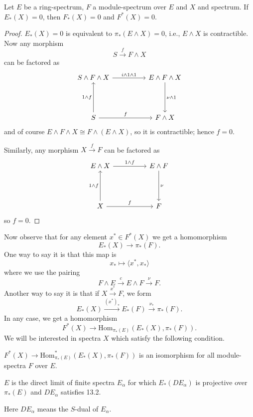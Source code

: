 \documentclass[../main]{subfiles}
\begin{document}
\begin{lemma}\label{lem:p3ch13.1}
Let $E$ be a ring-spectrum, $F$ a module-spectrum over $E$ and $X$ and spectrum. If $E_\ast(X) = 0$, then $F_\ast(X) = 0$ and $F^\ast(X) = 0$.
\end{lemma}
\begin{proof}
$E_*(X) = 0$ is equivalent to $\pi_\ast(E\wedge X) = 0$, i.e., $E\wedge X$ is contractible. Now any morphism \[S\overset{f}{\longrightarrow}F\wedge X\]
can be factored as
\[\begin{tikzcd}
	{S\wedge F \wedge X} && {E\wedge F \wedge X} \\
	&& {} \\
	S && {F \wedge X}
	\arrow["{i\wedge 1\wedge1}", from=1-1, to=1-3]
	\arrow["{\nu \wedge1}", from=1-3, to=3-3]
	\arrow["{1\wedge f}", from=3-1, to=1-1]
	\arrow["f", from=3-1, to=3-3]
\end{tikzcd}\]
and of course $E \wedge F\wedge X \cong F \wedge(E \wedge X)$, so it is contractible; hence $f=0$.

Similarly, any morphism $X\overset{f}{\longrightarrow}F$ can be factored as
\[\begin{tikzcd}
	{E \wedge X} && {E\wedge F} \\
	&& {} \\
	X && F
	\arrow["{1\wedge f}", from=1-1, to=1-3]
	\arrow["{\nu}", from=1-3, to=3-3]
	\arrow["{1\wedge f}", from=3-1, to=1-1]
	\arrow["f", from=3-1, to=3-3]
\end{tikzcd}\]
so $f=0$.
\end{proof}
Now observe that for any element $x^\ast \in F^\ast(X)$ we get a homomorphism
\[E_\ast(X)\longrightarrow \pi_\ast(F).\]
One way to say it is that this map is
\[x_\ast \mapsto \langle x^\ast, x_\ast \rangle\]
where we use the pairing 
\[F\wedge E \overset{c}{\longrightarrow} E\wedge F \overset{\nu}{\longrightarrow} F.\]
Another way to say it is that if $X\overset{x^\ast}{\longrightarrow}F$, we form
\[E_\ast(X)\overset{\left(x^\ast\right)_\ast}{\longrightarrow}E_\ast(F)\overset{\nu_\ast}{\longrightarrow}\pi_\ast(F).\]
In any case, we get a homomorphism
\[F^\ast(X)\longrightarrow \text{Hom}_{\pi_\ast(E)}(E_\ast(X), \pi_\ast(F)).\]
We will be interested in spectra $X$ which satisfy the following condition.

\begin{condition}\label{cond:p3ch13.2} $F^\ast(X)\longrightarrow\text{Hom}^\ast_{\pi_\ast(E)}(E_\ast(X), \pi_\ast(F))$ is an isomorphism for all module-spectra $F$ over $E$.
\end{condition}
\begin{condition}\label{cond:p3ch13.3} $E$ is the direct limit of finite spectra $E_\alpha$ for which $E_\ast(DE_\alpha)$ is projective over $\pi_\ast(E)$ and $DE_\alpha$ satisfies 13.2.
\end{condition}
Here $DE_\alpha$ means the $S$-dual of $E_\alpha$.
\end{document}
